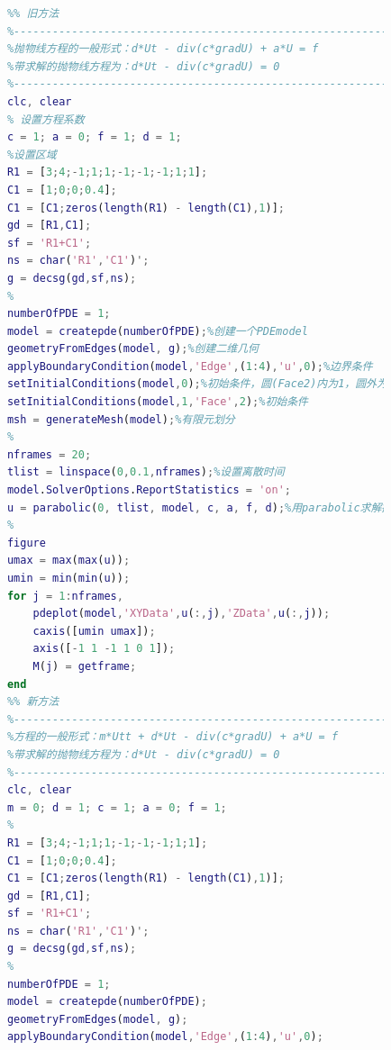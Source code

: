             \begin{lstlisting}[language = Matlab]
            %%%%%%%%%%%%%%% 示例3：金属板的热传导问题 %%%%%%%%%%%%%%%%
            %% 旧方法
            %-------------------------------------------------------------------
            %抛物线方程的一般形式：d*Ut - div(c*gradU) + a*U = f
            %带求解的抛物线方程为：d*Ut - div(c*gradU) = 0
            %-------------------------------------------------------------------
            clc, clear
            % 设置方程系数
            c = 1; a = 0; f = 1; d = 1;
            %设置区域
            R1 = [3;4;-1;1;1;-1;-1;-1;1;1];
            C1 = [1;0;0;0.4];
            C1 = [C1;zeros(length(R1) - length(C1),1)];
            gd = [R1,C1];
            sf = 'R1+C1';
            ns = char('R1','C1')';
            g = decsg(gd,sf,ns);
            %
            numberOfPDE = 1;
            model = createpde(numberOfPDE);%创建一个PDEmodel
            geometryFromEdges(model, g);%创建二维几何
            applyBoundaryCondition(model,'Edge',(1:4),'u',0);%边界条件
            setInitialConditions(model,0);%初始条件，圆(Face2)内为1，圆外为0。
            setInitialConditions(model,1,'Face',2);%初始条件
            msh = generateMesh(model);%有限元划分
            %
            nframes = 20;
            tlist = linspace(0,0.1,nframes);%设置离散时间
            model.SolverOptions.ReportStatistics = 'on';
            u = parabolic(0, tlist, model, c, a, f, d);%用parabolic求解抛物型方程
            %
            figure
            umax = max(max(u));
            umin = min(min(u));
            for j = 1:nframes,
                pdeplot(model,'XYData',u(:,j),'ZData',u(:,j));
                caxis([umin umax]);
                axis([-1 1 -1 1 0 1]);
                M(j) = getframe;
            end
            %% 新方法
            %-------------------------------------------------------------------
            %方程的一般形式：m*Utt + d*Ut - div(c*gradU) + a*U = f
            %带求解的抛物线方程为：d*Ut - div(c*gradU) = 0
            %-------------------------------------------------------------------
            clc, clear
            m = 0; d = 1; c = 1; a = 0; f = 1;
            %
            R1 = [3;4;-1;1;1;-1;-1;-1;1;1];
            C1 = [1;0;0;0.4];
            C1 = [C1;zeros(length(R1) - length(C1),1)];
            gd = [R1,C1];
            sf = 'R1+C1';
            ns = char('R1','C1')';
            g = decsg(gd,sf,ns);
            %
            numberOfPDE = 1;
            model = createpde(numberOfPDE);
            geometryFromEdges(model, g);
            applyBoundaryCondition(model,'Edge',(1:4),'u',0);

\end{lstlisting}
